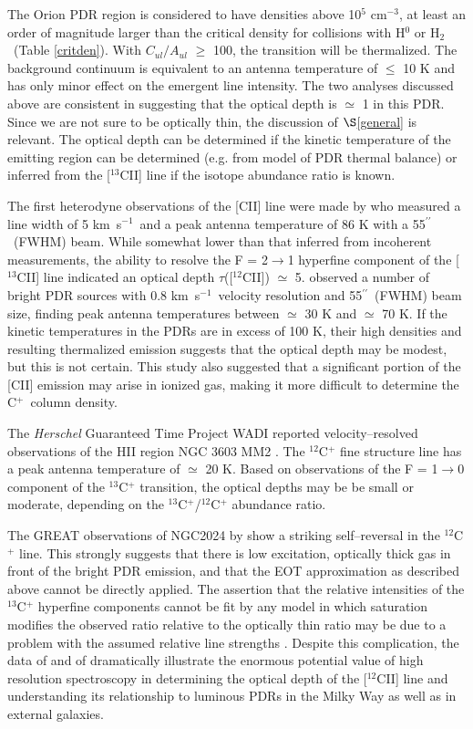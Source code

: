 \documentclass[12pt]{aastex}
\def \arcsec{\hbox{$^{\prime\prime}$}}
\def \cc{cm$^{-3}$}
\def \kms{km\ s$^{-1}$}
\def \hh{H$_2$}
\def \cp{C$^+$}
\def \C2{C{\sc II}}
\begin{document}
The Orion PDR region is considered to have densities above 10$^5$ \cc, at least an order of magnitude larger than the critical density for collisions with H$^0$ or \hh\ (Table \ref{critden}).  With $C_{ul}/A_{ul}$ $\geq$ 100, the transition will be thermalized.  
The background continuum is equivalent to an antenna temperature of $\leq$ 10 K and has only minor effect on the emergent line intensity.  
The two analyses discussed above are consistent in suggesting that the optical depth is $\simeq$ 1 in this PDR.  
Since we are not sure to be optically thin, the discussion of $\S$\ref{general} is relevant.  
The optical depth can be determined if the kinetic temperature of the emitting region can be determined (e.g. from model of PDR thermal balance) or inferred from the [$^{13}$\C2] line if the isotope abundance ratio is known.

The first heterodyne observations of the [\C2] line were made by \citet{boreiko1988} who measured a line width of 5 \kms\  and a peak antenna temperature of 86 K with a 55\arcsec\ (FWHM) beam.  
While somewhat lower than that inferred from incoherent measurements, the ability to resolve the F = 2$\rightarrow$1 hyperfine component of the [$^{13}$\C2] line indicated an optical depth $\tau$([$^{12}$\C2]) $\simeq$ 5.  
\citet{boreiko1990} observed a number of bright PDR sources with 0.8 \kms\ velocity resolution and 55\arcsec\ (FWHM) beam size, finding peak antenna temperatures between $\simeq$ 30 K and $\simeq$ 70 K.  
If the kinetic temperatures in the PDRs are in excess of 100 K, their high densities and resulting thermalized emission suggests that the optical depth may be modest, but this is not certain.  
This study also suggested that a significant portion of the [\C2] emission may arise in ionized gas, making it more difficult to determine the \cp\ column density.  

The {\it Herschel} Guaranteed Time Project WADI reported velocity--resolved observations of the HII region NGC 3603 MM2 \citep{ossenkopf2011}. 
The $^{12}$C$^+$ fine structure line has a peak antenna temperature of $\simeq$ 20 K.  
Based on observations of the F = 1$\rightarrow$0 component of the $^{13}$C$^+$ transition, the optical depths may be be small or moderate, depending on the $^{13}$C$^+$/$^{12}$C$^+$ abundance ratio.

The GREAT observations of NGC2024 by \citet{graf2012}  show a striking self--reversal in the $^{12}$C$^+$ line.  
This strongly suggests that there is  low excitation, optically thick gas in front of the bright PDR emission, and that the EOT approximation as described above cannot be directly applied.  
The assertion that the relative intensities of the  $^{13}$C$^+$ hyperfine components cannot be fit by any model in which saturation modifies the observed ratio relative to the optically thin ratio may be due to a problem with the assumed relative line strengths \citep{ossenkopf2012a}.  Despite this complication, the data of \citet{graf2012} and of \citet{ossenkopf2012b} dramatically illustrate the enormous potential value of high resolution spectroscopy in determining the optical depth of the [$^{12}$\C2] line and understanding its relationship to luminous PDRs in the Milky Way as well as in external galaxies.
\end{document}
